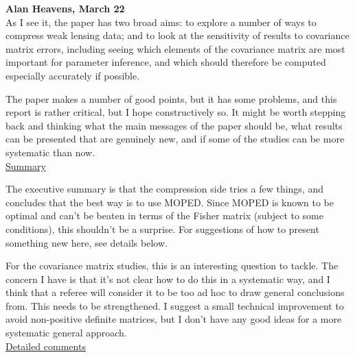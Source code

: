 \documentclass{article}
\begin{document}
	
	\textbf{Alan Heavens, March 22} \\
	
	As I see it, the paper has two broad aims: to explore a number of ways to compress weak lensing data; and to look at the sensitivity of results to covariance matrix errors, including seeing which elements of the covariance matrix are most important for parameter inference, and which should therefore be computed especially accurately if possible.
	
	The paper makes a number of good points, but it has some problems, and this report is rather critical, but I hope constructively so.  It might be worth stepping back and thinking what the main messages of the paper should be, what results can be presented that are genuinely new, and if some of the studies can be more systematic than now.  \\
	
	\underline{Summary}
	
	The executive summary is that the compression side tries a few things, and concludes that the best way is to use MOPED.  Since MOPED is known to be optimal and can’t be beaten in terms of the Fisher matrix (subject to some conditions), this shouldn’t be a surprise.  For suggestions of how to present something new here, see details below.
	
	For the covariance matrix studies, this is an interesting question to tackle.  The concern I have is that it’s not clear how to do this in a systematic way, and I think that a referee will consider it to be too ad hoc to draw general conclusions from.  This needs to be strengthened.  I suggest a small technical improvement to avoid non-positive definite matrices, but I don’t have any good ideas for a more systematic general approach. \\
	
	\underline{Detailed comments}
	
\end{document}
